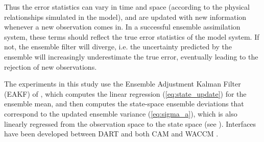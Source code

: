 Thus the error statistics can vary in time and space (according to the physical relationships simulated in the model), and are updated with new information whenever a new observation comes in.  
In a successful ensemble assimilation system, these terms should reflect the true error statistics of the model system.
If not, the ensemble filter will diverge, i.e. the uncertainty predicted by the ensemble will increasingly underestimate the true error, eventually leading to the rejection of new observations.

The experiments in this study use the Ensemble Adjustment Kalman Filter (EAKF) of \citet{anderson2001}, which computes the linear regression (\ref{eq:state_update}) for the ensemble mean, and then computes the state-space ensemble deviations that correspond to the updated ensemble variance (\ref{eq:sigma_a}), which is also linearly regressed from the observation space to the state space (see \citet{Anderson2003}). 
Interfaces have been developed between DART and both CAM \citep[][see Section \ref{sec:assimilation_variable}]{Raeder2012} and WACCM \citep[][see Section \ref{sec:evaluation_variable}]{Pedatella2013}.
